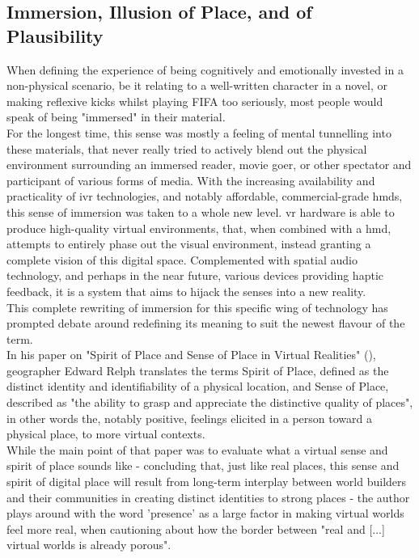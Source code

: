 \subsection{Immersion, Illusion of Place, and of Plausibility}

When defining the experience of being cognitively and emotionally invested in a non-physical scenario, be it relating to a well-written character in a novel, or making reflexive kicks whilst playing FIFA too seriously, most people would speak of being "immersed" in their material.\\
For the longest time, this sense was mostly a feeling of mental tunnelling into these materials, that never really tried to actively blend out the physical environment surrounding an immersed reader, movie goer, or other spectator and participant of various forms of media. With the increasing availability and practicality of \gls{ivr} technologies, and notably affordable, commercial-grade \glspl{hmd}, this sense of immersion was taken to a whole new level. \gls{vr} hardware is able to produce high-quality virtual environments, that, when combined with a \gls{hmd}, attempts to entirely phase out the visual environment, instead granting a complete vision of this digital space. Complemented with spatial audio technology, and perhaps in the near future, various devices providing haptic feedback, it is a system that aims to hijack the senses into a new reality.\\

This complete rewriting of immersion for this specific wing of technology has prompted debate around redefining its meaning to suit the newest flavour of the term.\\
In his paper on "Spirit of Place and Sense of Place in Virtual Realities" (\cite{relph-2007-spirit}), geographer Edward Relph translates the terms Spirit of Place, defined as the distinct identity and identifiability of a physical location, and Sense of Place, described as "the ability to grasp and appreciate the distinctive quality of places", in other words the, notably positive, feelings elicited in a person toward a physical place, to more virtual contexts.\\
While the main point of that paper was to evaluate what a virtual sense and spirit of place sounds like - concluding that, just like real places, this sense and spirit of digital place will result from long-term interplay between world builders and their communities in creating distinct identities to strong places - the author plays around with the word 'presence' as a large factor in making virtual worlds feel more real, when cautioning about how the border between "real and [...] virtual worlds is already porous".\\

